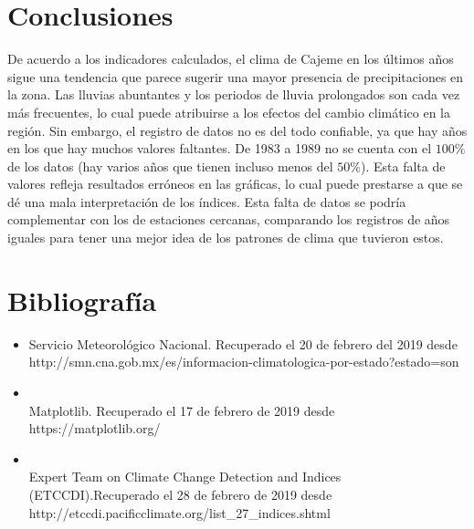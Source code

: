 \documentclass[letterpaper,12pt]{article}
\begin{document}
\section{Conclusiones}
De acuerdo a los indicadores calculados, el clima de Cajeme en los últimos años sigue una tendencia que parece sugerir una mayor presencia de precipitaciones en la zona. Las lluvias abuntantes y los periodos de lluvia prolongados son cada vez más frecuentes, lo cual puede atribuirse a los efectos del cambio climático en la región. 
Sin embargo, el registro de datos no es del todo confiable, ya que hay años en los que hay muchos valores faltantes. De 1983 a 1989 no se cuenta con el $100\%$ de los datos (hay varios años que tienen incluso menos del $50\%$). Esta falta de valores refleja resultados erróneos en las gráficas, lo cual puede prestarse a que se dé una mala interpretación de los índices. 
Esta falta de datos se podría complementar con los de estaciones cercanas, comparando los registros de años iguales para tener una mejor idea de los patrones de clima que tuvieron estos.

\section*{Bibliografía}
\begin{itemize}
\item Servicio Meteorológico Nacional. Recuperado el 20 de febrero del 2019 desde \\http://smn.cna.gob.mx/es/informacion-climatologica-por-estado?estado=son
\item \\Matplotlib. Recuperado el 17 de febrero de 2019 desde \\https://matplotlib.org/
\item \\Expert Team on Climate Change Detection and Indices (ETCCDI).Recuperado el 28 de febrero de 2019 desde \\http://etccdi.pacificclimate.org/list\_27\_indices.shtml
\end{itemize}
\end{document}

